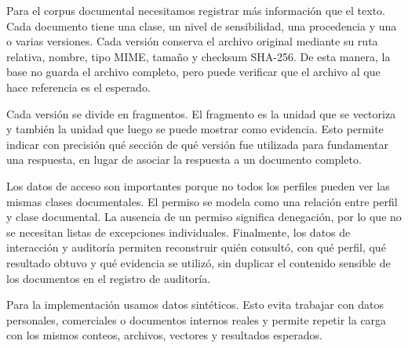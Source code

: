 Para el corpus documental necesitamos registrar más información que el texto. Cada documento tiene una clase, un nivel de sensibilidad, una procedencia y una o varias versiones. Cada versión conserva el archivo original mediante su ruta relativa, nombre, tipo MIME, tamaño y checksum SHA-256. De esta manera, la base no guarda el archivo completo, pero puede verificar que el archivo al que hace referencia es el esperado.

Cada versión se divide en fragmentos. El fragmento es la unidad que se vectoriza y también la unidad que luego se puede mostrar como evidencia. Esto permite indicar con precisión qué sección de qué versión fue utilizada para fundamentar una respuesta, en lugar de asociar la respuesta a un documento completo.

Los datos de acceso son importantes porque no todos los perfiles pueden ver las mismas clases documentales. El permiso se modela como una relación entre perfil y clase documental. La ausencia de un permiso significa denegación, por lo que no se necesitan listas de excepciones individuales. Finalmente, los datos de interacción y auditoría permiten reconstruir quién consultó, con qué perfil, qué resultado obtuvo y qué evidencia se utilizó, sin duplicar el contenido sensible de los documentos en el registro de auditoría.

Para la implementación usamos datos sintéticos. Esto evita trabajar con datos personales, comerciales o documentos internos reales y permite repetir la carga con los mismos conteos, archivos, vectores y resultados esperados.

